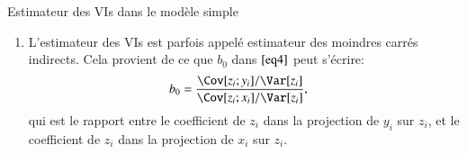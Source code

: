 \begin{frame}[allowframebreaks]{Estimateur des VIs dans le modèle simple}
\begin{remark_fr}
\begin{enumerate}[$\star$]
            La variable instrumentale $z_i$ n’est pas une variable explicative 
            dans le modèle de $y_i$. 
            On parle alors de relation d’exclusion (de la VI $z_i$ vis-à-vis du modèle de $y_i$). 
            \item L'estimateur des VIs est parfois appelé estimateur des moindres carrés indirects. 
            Cela provient de ce que $b_0$ dans $\eqref{eq4}$ peut s'écrire: 
            \begin{align*}
                b_0 &= \frac{\Cov[z_i; y_i] / \Var[z_i]}{\Cov[z_i;x_i] / \Var[z_i]},
                \end{align*}
            qui est le rapport entre le coefficient de $z_i$ dans la projection de $y_i$ sur $z_i$, 
            et le coefficient de $z_i$ dans la projection de $x_i$ sur $z_i$.
        \end{enumerate}
    \end{remark_fr}
    \end{frame}   
